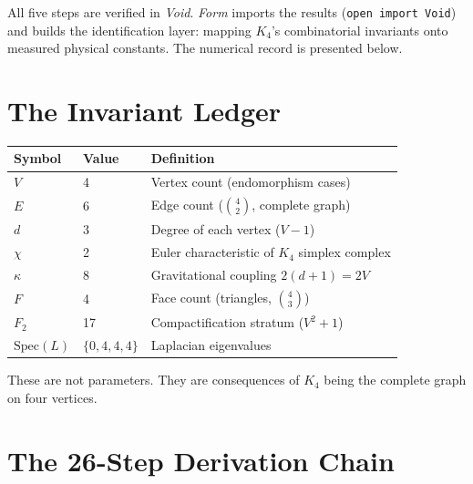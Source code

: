 \documentclass[11pt,a4paper]{article}
\theoremstyle{definition}
\begin{document}
All five steps are verified in \textit{Void}.  \textit{Form} imports
the results (\texttt{open import Void}) and builds the identification
layer: mapping $K_4$'s combinatorial invariants onto measured physical
constants.  The numerical record is presented below.

\section{The Invariant Ledger}
\label{sec:ledger}

\begin{center}
\renewcommand{\arraystretch}{1.3}
\begin{tabular}{@{}lll@{}}
\toprule
\textbf{Symbol} & \textbf{Value} & \textbf{Definition} \\
\midrule
$V$        & 4  & Vertex count (endomorphism cases) \\
$E$        & 6  & Edge count ($\binom{4}{2}$, complete graph) \\
$d$        & 3  & Degree of each vertex ($V - 1$) \\
$\chi$     & 2  & Euler characteristic of $K_4$ simplex complex \\
$\kappa$   & 8  & Gravitational coupling $2(d+1) = 2V$ \\
$F$        & 4  & Face count (triangles, $\binom{4}{3}$) \\
$F_2$      & 17 & Compactification stratum ($V^2 + 1$) \\
$\mathrm{Spec}(L)$ & $\{0, 4, 4, 4\}$ & Laplacian eigenvalues \\
\bottomrule
\end{tabular}
\end{center}

\noindent These are not parameters.  They are consequences of $K_4$ being the
complete graph on four vertices.

\section{The 26-Step Derivation Chain}
\label{sec:chain}
\end{document}
